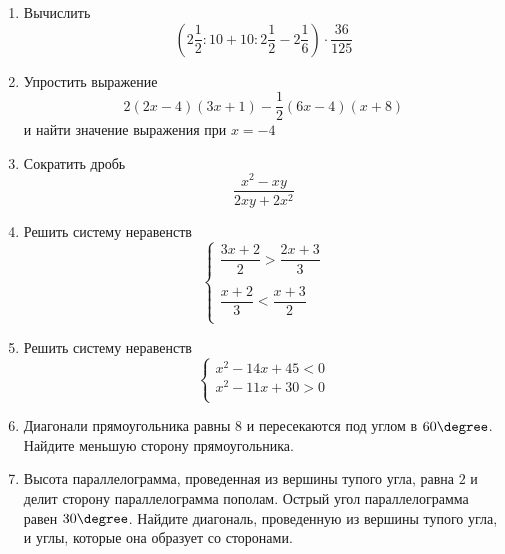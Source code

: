 \documentclass[12pt, a4paper]{article}
\begin{document}
	
	\begin{enumerate}
		\item Вычислить $$\left(2\dfrac{1}{2}:10+10:2\dfrac{1}{2}-2\dfrac{1}{6}\right)\cdot\dfrac{36}{125}$$
		\item Упростить выражение $$2(2x-4)(3x+1)-\dfrac{1}{2}(6x-4)(x+8)$$ и найти значение выражения при $x=-4$
		\item Сократить дробь $$\dfrac{x^2-xy}{2xy+2x^2}$$
		\item Решить систему неравенств 
		$$
		\left\{
		\begin{array}{l}
			\dfrac{3x+2}{2}>\dfrac{2x+3}{3}\\\\
			\dfrac{x+2}{3}<\dfrac{x+3}{2}\\
		\end{array}
		\right.
		$$
		\item Решить систему неравенств 
		$$
		\left\{
		\begin{array}{l}
			x^2-14x+45 < 0\\
			x^2-11x+30 > 0\\
		\end{array}
		\right.
		$$
		\item Диагонали прямоугольника равны 8 и пересекаются под углом в $60\degree$. Найдите меньшую сторону прямоугольника.
		\item Высота параллелограмма, проведенная из вершины тупого угла, равна $2$ и делит сторону параллелограмма пополам. Острый угол параллелограмма равен $30\degree$. Найдите диагональ, проведенную из вершины тупого угла, и углы, которые она образует со сторонами.
	\end{enumerate}
\end{document}
